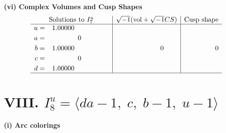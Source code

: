 \documentclass[1p]{elsarticle_modified}
\theoremstyle{definition}
\newcommand{\I}{\sqrt{-1}}
\begin{document}
\newpage\flushleft \textbf{(vi) Complex Volumes and Cusp Shapes}
$$\begin{array}{c|c|c}  
\text{Solutions to }I^u_{7}& \I (\text{vol} + \sqrt{-1}CS) & \text{Cusp shape}\\
 \hline 
\begin{aligned}
u &= \phantom{-}1.00000\phantom{ +0.000000I} \\
a &= \phantom{-0.000000 } 0 \\
b &= \phantom{-}1.00000\phantom{ +0.000000I} \\
c &= \phantom{-0.000000 } 0 \\
d &= \phantom{-}1.00000\phantom{ +0.000000I}\end{aligned}
 & \phantom{-0.000000 } 0 & \phantom{-0.000000 } 0\\
 \hline 
 \end{array}$$\newpage\newpage\renewcommand{\arraystretch}{1}
\centering \section*{VIII. $I^u_{8}= \langle d a-1,\;c,\;b-1,\;u-1 \rangle$}
\flushleft \textbf{(i) Arc colorings}\\
\end{document}
